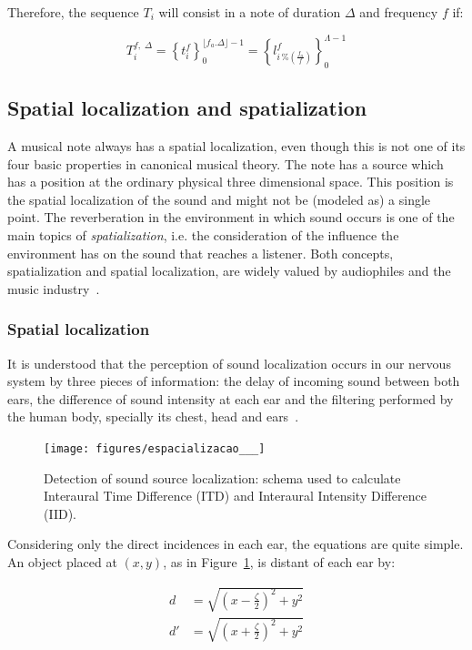 Therefore, the sequence $T_i$ will consist in a note of duration $\Delta$ and frequency $f$ if:

\begin{equation}\label{eq:notaBasicaTimbre}
T_i^{f,\; \Delta}=\left\{t_i^f\right\}_0^{\lfloor f_a . \Delta \rfloor -1}=\left \{ l^f_{i\,\%\left(\frac{f_a}{f}\right)} \right \}_0^{\Lambda-1}
\end{equation}

\subsection{Spatial localization and spatialization}\label{subsec:spac}
A musical note always has a spatial localization, even though this is not one of its four basic properties in canonical musical theory. The note has a source which has a position at the ordinary physical three dimensional space. This position is the spatial localization of the sound and might not be (modeled as) a single point. The reverberation in the environment in which sound occurs is one of the main topics of \emph{spatialization}, i.e. the consideration of the influence the environment has on the sound that reaches a listener. Both concepts, spatialization and spatial localization, are widely valued by audiophiles and the music industry~\cite{floEsp}. 

\subsubsection{Spatial localization}
It is understood that the perception of sound localization occurs in our nervous system by three pieces of information: the delay of incoming sound between both ears, the difference of sound intensity at each ear and the filtering performed by the human body, specially its chest, head and ears~\cite{Roederer, hrtf, Heeger}. 

\begin{figure}[h!]
    \centering
        \texttt{[image: figures/espacializacao\_\_\_]}
    \caption{Detection of sound source localization: schema used to calculate Interaural Time Difference (ITD) and Interaural Intensity Difference (IID).}
    \label{fig:spac}
\end{figure}

Considering only the direct incidences in each ear, the equations are quite simple. An object placed at $(x,y)$, as in Figure~\ref{fig:spac}, is distant of each ear by:

\begin{equation}\label{eq:distOuvidos}
\begin{split}
d & =\sqrt{\left (x-\frac{\zeta}{2} \right )^2+y^2} \\
d' & =\sqrt{\left (x+\frac{\zeta}{2} \right )^2 + y^2}
\end{split}
\end{equation}

